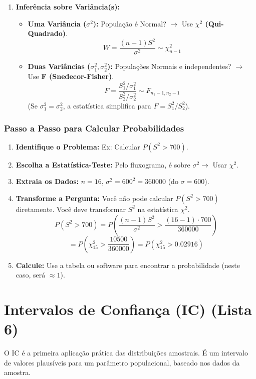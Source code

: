 \begin{enumerate}
    \item \textbf{Inferência sobre Variância(s):}
    \begin{itemize}
        \item \textbf{Uma Variância ($\sigma^2$):} População é Normal? $\rightarrow$ Use \textbf{$\chi^2$ (Qui-Quadrado)}.
        $$ W = \frac{(n-1)S^2}{\sigma^2} \sim \chi^2_{n-1} $$
        \item \textbf{Duas Variâncias ($\sigma_1^2, \sigma_2^2$):} Populações Normais e independentes? $\rightarrow$ Use \textbf{F (Snedecor-Fisher)}.
        $$ F = \frac{S_1^2 / \sigma_1^2}{S_2^2 / \sigma_2^2} \sim F_{n_1-1, n_2-1} $$
        (Se $\sigma_1^2 = \sigma_2^2$, a estatística simplifica para $F = S_1^2 / S_2^2$).
    \end{itemize}
\end{enumerate}

\subsubsection{Passo a Passo para Calcular Probabilidades}
\begin{enumerate}
    \item \textbf{Identifique o Problema:} Ex: Calcular $P(S^2 > 700)$.
    \item \textbf{Escolha a Estatística-Teste:} Pelo fluxograma, é sobre $\sigma^2 \rightarrow$ Usar $\chi^2$.
    \item \textbf{Extraia os Dados:} $n=16$, $\sigma^2 = 600^2 = 360000$ (do $\sigma=600$).
    \item \textbf{Transforme a Pergunta:} Você não pode calcular $P(S^2 > 700)$ diretamente. Você deve transformar $S^2$ na estatística $\chi^2$.
    $$ P(S^2 > 700) = P\left( \frac{(n-1)S^2}{\sigma^2} > \frac{(16-1) \cdot 700}{360000} \right) $$
    $$ = P\left( \chi^2_{15} > \frac{10500}{360000} \right) = P(\chi^2_{15} > 0.02916) $$
    \item \textbf{Calcule:} Use a tabela ou software para encontrar a probabilidade (neste caso, será $\approx 1$).
\end{enumerate}

\section{Intervalos de Confiança (IC) (Lista 6)}
\label{sec:ic}
O IC é a primeira aplicação prática das distribuições amostrais. É um intervalo de valores plausíveis para um parâmetro populacional, baseado nos dados da amostra.

